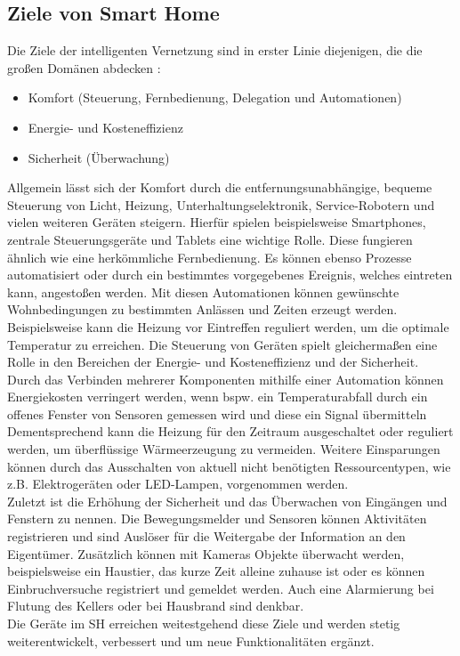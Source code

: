     \subsection{Ziele von Smart Home} %
    \label{subsec:ziele_sh}
        Die Ziele der intelligenten Vernetzung sind in erster Linie diejenigen, die die 
        großen Domänen abdecken \cite{goals-smarthome}:
        \begin{itemize}
            \item Komfort (Steuerung, Fernbedienung, Delegation und Automationen)
            \item Energie- und Kosteneffizienz
            \item Sicherheit (Überwachung)
        \end{itemize}
        Allgemein lässt sich der Komfort durch die entfernungsunabhängige, bequeme Steuerung von Licht, Heizung, Unterhaltungselektronik, 
        Service-Robotern und vielen weiteren Geräten steigern. 
        Hierfür spielen beispielsweise Smartphones, zentrale Steuerungsgeräte und Tablets eine wichtige Rolle. 
        Diese fungieren ähnlich wie eine herkömmliche Fernbedienung. Es können ebenso Prozesse 
        automatisiert oder durch ein bestimmtes vorgegebenes Ereignis, welches 
        eintreten kann, angestoßen werden. Mit diesen Automationen können gewünschte Wohnbedingungen zu 
        bestimmten Anlässen und Zeiten erzeugt werden. Beispielsweise kann die Heizung vor Eintreffen reguliert 
        werden, um die optimale Temperatur zu erreichen. Die Steuerung von 
        Geräten spielt gleichermaßen eine Rolle in den Bereichen der Energie- und Kosteneffizienz und der Sicherheit. 
        \\
        \linebreak
        Durch das Verbinden mehrerer Komponenten mithilfe einer Automation können Energiekosten verringert werden, wenn 
        bspw. ein Temperaturabfall durch ein offenes Fenster von Sensoren gemessen wird und diese ein Signal übermitteln
        Dementsprechend kann die Heizung für den Zeitraum 
        ausgeschaltet oder reguliert werden, um überflüssige Wärmeerzeugung zu vermeiden. Weitere Einsparungen können durch 
        das Ausschalten von aktuell nicht benötigten Ressourcentypen, wie z.B. Elektrogeräten 
        oder LED-Lampen, vorgenommen werden.
        \\
        \linebreak
        Zuletzt ist die Erhöhung der Sicherheit und das Überwachen von Eingängen und Fenstern zu nennen.
        Die Bewegungsmelder und Sensoren können Aktivitäten registrieren und sind Auslöser für die Weitergabe 
        der Information an den Eigentümer. Zusätzlich können mit Kameras Objekte überwacht werden, beispielsweise ein Haustier, das 
        kurze Zeit alleine zuhause ist oder es können Einbruchversuche registriert und gemeldet werden. Auch eine Alarmierung bei 
        Flutung des Kellers oder bei Hausbrand sind denkbar.
        \\
        \linebreak
        Die Geräte im \acl{SH} erreichen weitestgehend diese Ziele und werden stetig weiterentwickelt, verbessert und um neue 
        Funktionalitäten ergänzt.

